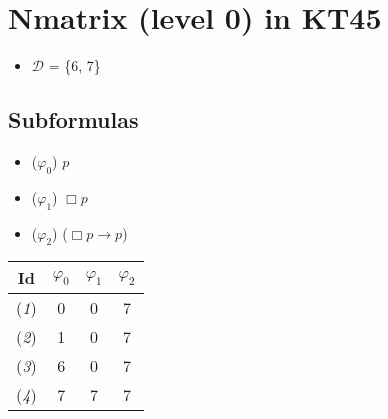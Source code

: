 \documentclass[
  14pt,
]{extarticle}
\author{}
\date{}
\providecommand{\tightlist}{%
  \setlength{\itemsep}{0pt}\setlength{\parskip}{0pt}}
\begin{document}
\hypertarget{nmatrix-level-0-in-kt45}{%
\section{Nmatrix (level 0) in KT45}\label{nmatrix-level-0-in-kt45}}

\begin{itemize}
\tightlist
\item
  \(\mathcal{D}\) = \{6, 7\}
\end{itemize}

\hypertarget{subformulas}{%
\subsection{Subformulas}\label{subformulas}}

\begin{itemize}
\tightlist
\item
  (\(\varphi_{0}\)) \(p\)
\item
  (\(\varphi_{1}\)) \(\Box\)\(p\)
\item
  (\(\varphi_{2}\)) (\(\Box\)\(p\)\(\to\)\(p\))
\end{itemize}

\begin{longtable}[]{@{}cccc@{}}
\toprule\noalign{}
Id & \(\varphi_{0}\) & \(\varphi_{1}\) & \(\varphi_{2}\) \\
\midrule\noalign{}
\endhead
\bottomrule\noalign{}
\endlastfoot
(\emph{1}) & 0 & 0 & 7 \\
(\emph{2}) & 1 & 0 & 7 \\
(\emph{3}) & 6 & 0 & 7 \\
(\emph{4}) & 7 & 7 & 7 \\
\end{longtable}
\end{document}
